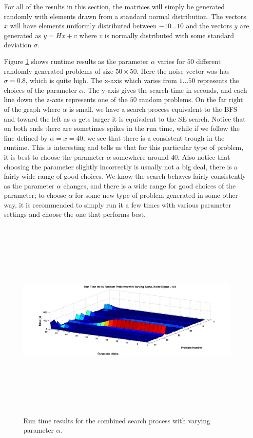 \documentclass[12pt,Bold,letterpaper]{mcgilletdclass}
\begin{document}
For all of the results in this section, the matrices will simply be generated randomly with elements drawn from a standard normal distribution. The vectors $x$ will have elements uniformly distributed between $-10 \dots 10$ and the vectors $y$ are generated as $y = Hx+v$ where $v$ is normally distributed with some standard deviation $\sigma$.

Figure \ref{fig:searchsurface} shows runtime results as the parameter $\alpha$ varies for $50$ different randomly generated problems of size $50 \times 50$. Here the noise vector was has $\sigma = 0.8$, which is quite high. The x-axis which varies from $1 \dots 50$ represents the choices of the parameter $\alpha$. The y-axis gives the search time in seconds, and each line down the z-axis represents one of the $50$ random problems. On the far right of the graph where $\alpha$ is small, we have a search process equivalent to the BFS and toward the left as $\alpha$ gets larger it is equivalent to the  SE search. Notice that on both ends there are sometimes spikes in the run time, while if we follow the line defined by $\alpha = x = 40$, we see that there is a consistent trough in the runtime. This is interesting and tells us that for this particular type of problem, it is best to choose the parameter $\alpha$ somewhere around $40$. Also notice that choosing the parameter slightly incorrectly is usually not a big deal, there is a fairly wide range of good choices. We know the search behaves fairly consistently as the parameter $\alpha$ changes, and there is a wide range for good choices of the parameter; to choose $\alpha$ for some new type of problem generated in some other way, it is recommended to simply run it a few times with various parameter settings and choose the one that performs best.

\begin{figure}
\centering
\includegraphics[width=6.5in,height=4in]{searchsurface.png}
\caption{Run time results for the combined search process with varying parameter $\alpha$.}
\label{fig:searchsurface}
\end{figure}
\end{document}

